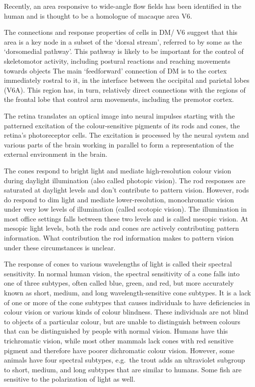 Recently, an area responsive to wide-angle flow fields has been identified in the human and is thought to be a homologue of macaque area V6.

The connections and response properties of cells in DM/ V6 suggest that this area is a key node in a subset of the `dorsal stream', referred to by some as the `dorsomedial pathway'. This pathway is likely to be important for the control of skeletomotor activity, including postural reactions and reaching movements towards objects The main `feedforward' connection of DM is to the cortex immediately rostral to it, in the interface between the occipital and parietal lobes (V6A). This region has, in turn, relatively direct connections with the regions of the frontal lobe that control arm movements, including the premotor cortex.

The retina translates an optical image into neural impulses starting with the patterned excitation of the colour-sensitive pigments of its rods and cones, the retina's photoreceptor cells. The excitation is processed by the neural system and various parts of the brain working in parallel to form a representation of the external environment in the brain.

The cones respond to bright light and mediate high-resolution colour vision during daylight illumination (also called photopic vision). The rod responses are saturated at daylight levels and don't contribute to pattern vision. However, rods do respond to dim light and mediate lower-resolution, monochromatic vision under very low levels of illumination (called scotopic vision). The illumination in most office settings falls between these two levels and is called mesopic vision. At mesopic light levels, both the rods and cones are actively contributing pattern information. What contribution the rod information makes to pattern vision under these circumstances is unclear.

The response of cones to various wavelengths of light is called their spectral sensitivity. In normal human vision, the spectral sensitivity of a cone falls into one of three subtypes, often called blue, green, and red, but more accurately known as short, medium, and long wavelength-sensitive cone subtypes. It is a lack of one or more of the cone subtypes that causes individuals to have deficiencies in colour vision or various kinds of colour blindness. These individuals are not blind to objects of a particular colour, but are unable to distinguish between colours that can be distinguished by people with normal vision. Humans have this trichromatic vision, while most other mammals lack cones with red sensitive pigment and therefore have poorer dichromatic colour vision. However, some animals have four spectral subtypes, e.g.~the trout adds an ultraviolet subgroup to short, medium, and long subtypes that are similar to humans. Some fish are sensitive to the polarization of light as well.


